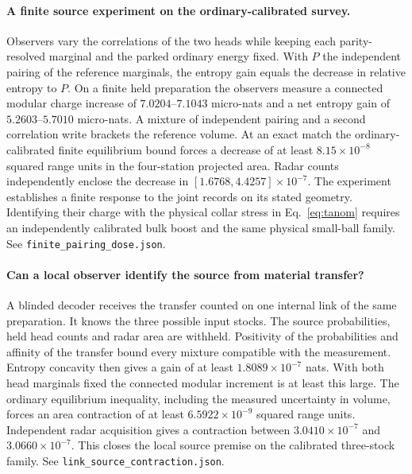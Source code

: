 \documentclass[11pt]{article}
\begin{document}
\paragraph{A finite source experiment on the ordinary-calibrated survey.}
Observers vary the correlations of the two heads while keeping each
parity-resolved marginal and the parked ordinary energy fixed. With
\(P\) the independent pairing of the reference marginals, the entropy
gain equals the decrease in relative entropy to \(P\). On a finite
held preparation the observers measure a connected modular charge
increase of \(7.0204\)--\(7.1043\) micro-nats and a net entropy gain
of \(5.2603\)--\(5.7010\) micro-nats. A mixture of independent pairing
and a second correlation write brackets the reference volume. At an
exact match the ordinary-calibrated finite equilibrium bound forces a
decrease of at least \(8.15\times10^{-8}\) squared range units in the
four-station projected area. Radar counts independently enclose the
decrease in \([1.6768,4.4257]\times10^{-7}\). The experiment
establishes a finite response to the joint records on its stated
geometry. Identifying their charge with the physical collar stress in
Eq.~\eqref{eq:tanom} requires an independently calibrated bulk boost
and the same physical small-ball family. See
\texttt{finite\_pairing\_dose.json}.

\paragraph{Can a local observer identify the source from material transfer?}
A blinded decoder receives the transfer counted on one internal link
of the same preparation. It knows the three possible input stocks.
The source probabilities, held head counts and radar area are
withheld. Positivity of the probabilities and affinity of the
transfer bound every mixture compatible with the measurement.
Entropy concavity then gives a gain of at least
\(1.8089\times10^{-7}\) nats. With both head marginals fixed the
connected modular increment is at least this large. The ordinary
equilibrium inequality, including the measured uncertainty in volume,
forces an area contraction of at least \(6.5922\times10^{-9}\)
squared range units. Independent radar acquisition gives a contraction
between \(3.0410\times10^{-7}\) and \(3.0660\times10^{-7}\).
This closes the local source premise on the calibrated three-stock
family. See \texttt{link\_source\_contraction.json}.
\end{document}
